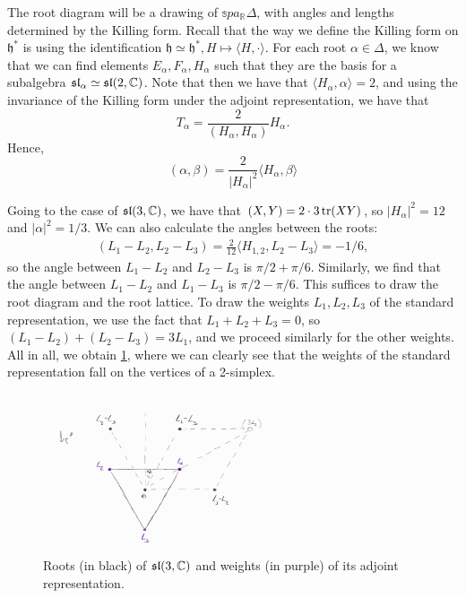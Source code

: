 \documentclass{report}
\begin{document}
The root diagram will be a drawing of $\mathbb spa_{\mathbb R} \Delta$, with angles and lengths determined by the Killing form.
Recall that the way we define the Killing form on $\mathfrak h^*$ is using the identification $\mathfrak h \simeq \mathfrak h^*, H \mapsto \langle H, \cdot \rangle$.
For each root $\alpha \in \Delta$, we know that we can find elements $E_\alpha, F_\alpha, H_\alpha$ such that they are the basis for a subalgebra $\operatorname{{\mathfrak{sl}}}_\alpha \simeq \operatorname{{\mathfrak{sl}}}(2, \mathbb C)$.
Note that then we have that $\langle H_\alpha, \alpha \rangle = 2$, and using the invariance of the Killing form under the adjoint representation, we have that
\[
T_\alpha = \frac{2}{(H_\alpha, H_\alpha)} H_\alpha.
\]
Hence,
\[
(\alpha, \beta) = \frac{2}{|H_\alpha|^2} \langle H_\alpha, \beta \rangle
\]

Going to the case of $\operatorname{{\mathfrak{sl}}}(3, \mathbb C)$, we have that $(X, Y) = 2 \cdot 3 \operatorname{tr}(XY)$, so $|H_\alpha|^2 = 12$ and $|\alpha|^2 = 1/3$.
We can also calculate the angles between the roots:
\begin{align*}
    (L_1 - L_2, L_2 - L_3) = \frac{2}{12} \langle H_{1,2}, L_2 - L_3 \rangle = -1/6,
\end{align*}
so the angle between $L_1 - L_2$ and $L_2 - L_3$ is $\pi/2 + \pi/6$.
Similarly, we find that the angle between $L_1 - L_2$ and $L_1 - L_3$ is $\pi/2 - \pi/6$.
This suffices to draw the root diagram and the root lattice.
To draw the weights $L_1, L_2, L_3$ of the standard representation, we use the fact that $L_1 + L_2 + L_3 = 0$, so $(L_1 - L_2) + (L_2 - L_3) = 3 L_1$, and we proceed similarly for the other weights.
All in all, we obtain \cref{fig:roots_and_weights_for_standard_sl_3_C}, where we can clearly see that the weights of the standard representation fall on the vertices of a 2-simplex.
\begin{figure}[h]\label{fig:roots_and_weights_for_standard_sl_3_C}
    \centering
    \includegraphics[width=0.6\textwidth]{roots_and_weights_for_standard_sl_3_C.jpg}
    \caption{Roots (in black) of $\operatorname{{\mathfrak{sl}}}(3,\mathbb C)$ and weights (in purple) of its adjoint representation.}
\end{figure}
\end{document}
